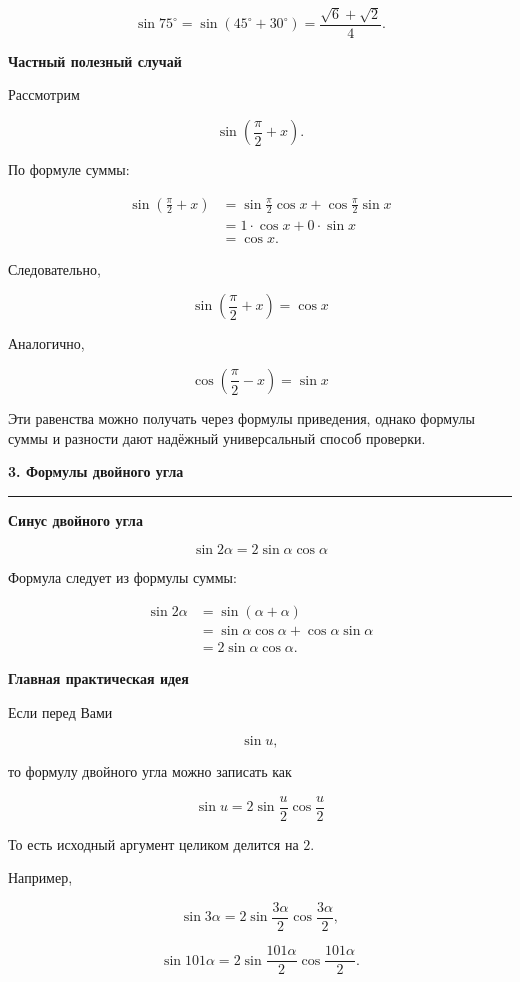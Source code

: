 \documentclass[a4paper,12pt]{article}
\newcommand{\maintitle}[1]{%
  {\Large\bfseries\color{darkaccent}#1\par}
  \vspace{0.5em}
  {\color{accent}\rule{\linewidth}{0.7pt}\par}
  \vspace{0.8em}
}
\newcommand{\subheading}[1]{%
  \vspace{0.7em}
  {\large\bfseries\color{darkaccent}#1\par}
  \vspace{0.25em}
}
\begin{document}
\[
\sin75^\circ
=
\sin(45^\circ+30^\circ)
=
\frac{\sqrt6+\sqrt2}{4}.
\]

\subheading{Частный полезный случай}

Рассмотрим

\[
\sin\left(\frac{\pi}{2}+x\right).
\]

По формуле суммы:

\[
\begin{aligned}
\sin\left(\frac{\pi}{2}+x\right)
&=
\sin\frac{\pi}{2}\cos x+
\cos\frac{\pi}{2}\sin x
\\
&=
1\cdot\cos x+0\cdot\sin x
\\
&=
\cos x.
\end{aligned}
\]

Следовательно,

\[
\boxed{
\sin\left(\frac{\pi}{2}+x\right)=\cos x
}
\]

Аналогично,

\[
\boxed{
\cos\left(\frac{\pi}{2}-x\right)=\sin x
}
\]

Эти равенства можно получать через формулы приведения, однако
формулы суммы и разности дают надёжный универсальный способ проверки.

\maintitle{3. Формулы двойного угла}

\subheading{Синус двойного угла}

\[
\boxed{
\sin 2\alpha=2\sin\alpha\cos\alpha
}
\]

Формула следует из формулы суммы:

\[
\begin{aligned}
\sin2\alpha
&=
\sin(\alpha+\alpha)
\\
&=
\sin\alpha\cos\alpha+
\cos\alpha\sin\alpha
\\
&=
2\sin\alpha\cos\alpha.
\end{aligned}
\]

\subheading{Главная практическая идея}

Если перед Вами

\[
\sin u,
\]

то формулу двойного угла можно записать как

\[
\boxed{
\sin u
=
2\sin\frac{u}{2}\cos\frac{u}{2}
}
\]

То есть исходный аргумент целиком делится на \(2\).

Например,

\[
\sin3\alpha
=
2\sin\frac{3\alpha}{2}
\cos\frac{3\alpha}{2},
\]

\[
\sin101\alpha
=
2\sin\frac{101\alpha}{2}
\cos\frac{101\alpha}{2}.
\]
\end{document}

